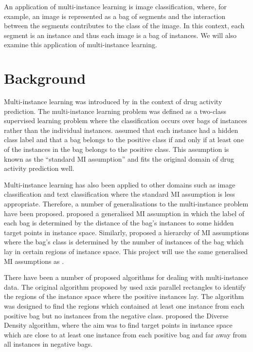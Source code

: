 \documentclass[a4paper,12pt]{article} %
\begin{document}
    
An application of multi-instance learning is image classification, where, for example, an image is represented as a bag of segments and the interaction between the segments contributes to the class of the image. In this context, each segment is an instance and thus each image is a bag of instances. We will also examine this application of multi-instance learning.

\section{Background}

Multi-instance learning was introduced by  in the context of drug activity prediction. The multi-instance learning problem was defined as a two-class supervised learning problem where the classification occurs over bags of instances rather than the individual instances.  assumed that each instance had a hidden class label and that a bag belongs to the positive class if and only if at least one of the instances in the bag belongs to the positive class. This assumption is known as the ``standard MI assumption'' and fits the original domain of drug activity prediction well.

Multi-instance learning has also been applied to other domains such as image classification and text classification where the standard MI assumption is less appropriate. Therefore, a number of generalisations to the multi-instance problem have been proposed.
 proposed a generalised MI assumption in which the label of each bag is determined by the distance of the bag's instances to some hidden target points in instance space.
Similarly,  proposed a hierarchy of MI assumptions where the bag's class is determined by the number of instances of the bag which lay in certain regions of instance space.
This project will use the same generalised MI assumptions as .

There have been a number of proposed algorithms for dealing with multi-instance data. The original algorithm proposed by  used axis parallel rectangles to identify the regions of the instance space where the positive instances lay. The algorithm was designed to find the regions which contained at least one instance from each positive bag but no instances from the negative class. 
 proposed the Diverse Density algorithm, where the aim was to find target points in instance space which are close to at least one instance from each positive bag and far away from all instances in negative bags.
\end{document}
